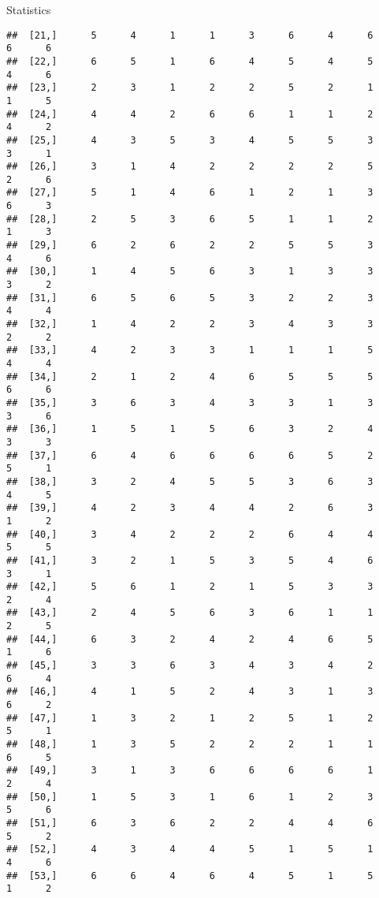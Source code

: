 \documentclass[
  ignorenonframetext,
]{beamer}
\begin{document}
\begin{frame}[fragile]{Statistics}
\begin{verbatim}
##  [21,]      5      4      1      1      3      6      4      6      6      6
##  [22,]      6      5      1      6      4      5      4      5      4      6
##  [23,]      2      3      1      2      2      5      2      1      1      5
##  [24,]      4      4      2      6      6      1      1      2      4      2
##  [25,]      4      3      5      3      4      5      5      3      3      1
##  [26,]      3      1      4      2      2      2      2      5      2      6
##  [27,]      5      1      4      6      1      2      1      3      6      3
##  [28,]      2      5      3      6      5      1      1      2      1      3
##  [29,]      6      2      6      2      2      5      5      3      4      6
##  [30,]      1      4      5      6      3      1      3      3      3      2
##  [31,]      6      5      6      5      3      2      2      3      4      4
##  [32,]      1      4      2      2      3      4      3      3      2      2
##  [33,]      4      2      3      3      1      1      1      5      4      4
##  [34,]      2      1      2      4      6      5      5      5      6      6
##  [35,]      3      6      3      4      3      3      1      3      3      6
##  [36,]      1      5      1      5      6      3      2      4      3      3
##  [37,]      6      4      6      6      6      6      5      2      5      1
##  [38,]      3      2      4      5      5      3      6      3      4      5
##  [39,]      4      2      3      4      4      2      6      3      1      2
##  [40,]      3      4      2      2      2      6      4      4      5      5
##  [41,]      3      2      1      5      3      5      4      6      3      1
##  [42,]      5      6      1      2      1      5      3      3      2      4
##  [43,]      2      4      5      6      3      6      1      1      2      5
##  [44,]      6      3      2      4      2      4      6      5      1      6
##  [45,]      3      3      6      3      4      3      4      2      6      4
##  [46,]      4      1      5      2      4      3      1      3      6      2
##  [47,]      1      3      2      1      2      5      1      2      5      1
##  [48,]      1      3      5      2      2      2      1      1      6      5
##  [49,]      3      1      3      6      6      6      6      1      2      4
##  [50,]      1      5      3      1      6      1      2      3      5      6
##  [51,]      6      3      6      2      2      4      4      6      5      2
##  [52,]      4      3      4      4      5      1      5      1      4      6
##  [53,]      6      6      4      6      4      5      1      5      1      2

\end{verbatim}
\end{frame}
\end{document}
